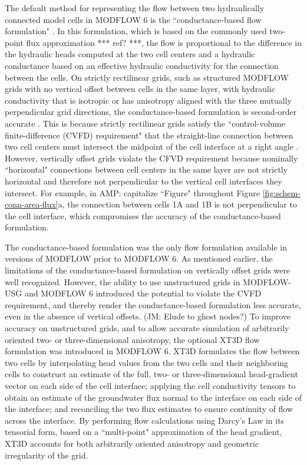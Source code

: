 \documentclass{article}
\begin{document}
The default method for representing the flow between two hydraulically connected model cells in MODFLOW 6 is the ``conductance-based flow formulation" \citep{modflow6gwf}. In this formulation, which is based on the commonly used two-point flux approximation {\color{red} *** ref? ***}, the flow is proportional to the difference in the hydraulic heads computed at the two cell centers and a hydraulic conductance based on an effective hydraulic conductivity for the connection between the cells. On strictly rectilinear grids, such as structured MODFLOW grids with no vertical offset between cells in the same layer, with hydraulic conductivity that is isotropic or has anisotropy aligned with the three mutually perpendicular grid directions, the conductance-based formulation is second-order accurate \citep{dehotin2010modeling, modflow6gwf}. This is because strictly rectilinear grids satisfy the ``control-volume finite-difference (CVFD) requirement" that the straight-line connection between two cell centers must intersect the midpoint of the cell interface at a right angle \citep{narasimhan1976integrated}. However, vertically offset grids violate the CFVD requirement because nominally ``horizontal" connections between cell centers in the same layer are not strictly horizontal and therefore not perpendicular to the vertical cell interfaces they intersect. For example, in {\color{red} AMP: capitalize ``Figure" throughout} Figure \ref{fig:schem-conn-area-flux}a, the connection between cells 1A and 1B is not perpendicular to the cell interface, which compromises the accuracy of the conductance-based formulation.

The conductance-based formulation was the only flow formulation available in versions of MODFLOW prior to MODFLOW 6. As mentioned earlier, the limitations of the conductance-based formulation on vertically offset grids were well recognized. However, the ability to use unstructured grids in MODFLOW-USG and MODFLOW 6 introduced the potential to violate the CVFD requirement, and thereby render the conductance-based formulation less accurate, even in the absence of vertical offsets. {\color{red} (JM: Elude to ghost nodes?)} To improve accuracy on unstructured grids, and to allow accurate simulation of arbitrarily oriented two- or three-dimensional anisotropy, the optional XT3D flow formulation \citep{modflow6xt3d} was introduced in MODFLOW 6. XT3D formulates the flow between two cells by interpolating head values from the two cells and their neighboring cells to construct an estimate of the full, two- or three-dimensional head-gradient vector on each side of the cell interface; applying the cell conductivity tensors to obtain an estimate of the groundwater flux  normal to the interface on each side of the interface; and reconciling the two flux estimates to ensure continuity of flow across the interface. By performing flow calculations using Darcy's Law in its tensorial form, based on a ``multi-point" approximation of the head gradient, XT3D accounts for both arbitrarily oriented anisotropy and geometric irregularity of the grid.
\end{document}
